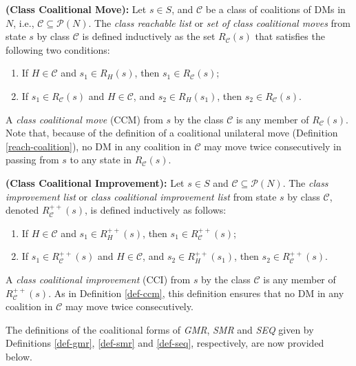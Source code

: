 \begin{definition}\label{def-ccm}
\rm {\bf (Class Coalitional Move):} Let $s \in S$, and $\mathcal{C}$ be a class of coalitions of DMs in $N$, i.e., $\mathcal{C} \subseteq \mathcal{P}(N)$. The \emph{class reachable list} or \emph{set of class coalitional moves} from state $s$ by class $\mathcal{C}$ is defined inductively as the set $R_\mathcal{C}(s)$ that satisfies the following two conditions:
\begin{enumerate}[(1)]
\item If $H \in \mathcal{C}$ and $s_1 \in R_H(s)$, then $s_1 \in R_\mathcal{C}(s)$;
\item If $s_1 \in R_\mathcal{C}(s)$ and $H \in \mathcal{C}$, and $s_2 \in R_H(s_1)$, then $s_2 \in R_\mathcal{C}(s)$.
\end{enumerate}
A \emph{class coalitional move} (CCM) from $s$ by the class $\mathcal{C}$ is any member of $R_\mathcal{C}(s)$. Note that, because of the definition of a coalitional unilateral move (Definition \ref{reach-coalition}), no DM in any coalition in $\mathcal{C}$ may move twice consecutively in passing from $s$ to any state in $R_\mathcal{C}(s)$.
\end{definition}

\begin{definition}\label{def-ccil}
\rm {\bf (Class Coalitional Improvement):} Let $s \in S $ and $\mathcal{C} \subseteq \mathcal{P}(N)$. The \emph{class improvement list} or \emph{class coalitional improvement list} from state $s$ by class $\mathcal{C}$, denoted $R_\mathcal{C}^{++}(s)$, is defined inductively as follows:
\begin{enumerate}[(1)]
\item If $H \in \mathcal{C}$ and $s_1 \in R_H^{++}(s)$, then $s_1 \in R_\mathcal{C}^{++}(s)$;
\item If $s_1 \in R_\mathcal{C}^{++}(s)$ and $H \in \mathcal{C}$, and $s_2 \in R_H^{++}(s_1)$, then $s_2 \in R_\mathcal{C}^{++}(s)$.
\end{enumerate}
A \emph{class coalitional improvement} (CCI) from $s$ by the class $\mathcal{C}$ is any member of $R_\mathcal{C}^{++}(s)$. As in Definition \ref{def-ccm}, this definition ensures that no DM in any coalition in $\mathcal{C}$ may move twice consecutively.
\end{definition}

\noindent The definitions of the coalitional forms of \emph{GMR}, \emph{SMR} and \emph{SEQ} given by Definitions \ref{def-gmr}, \ref{def-smr} and \ref{def-seq}, respectively, are now provided below.

